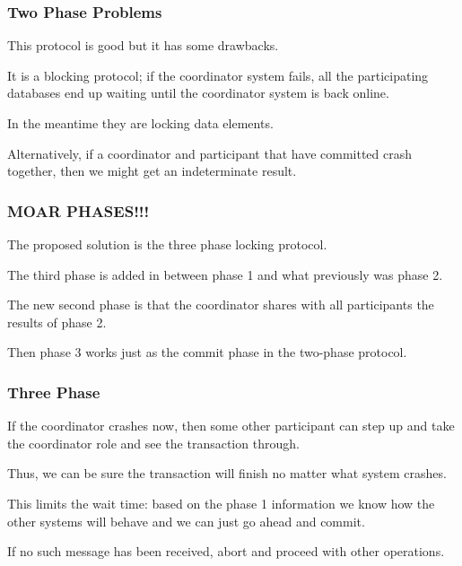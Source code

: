 \begin{frame}
\frametitle{Two Phase Problems}

This protocol is good but it has some drawbacks. 

It is a blocking protocol; if the coordinator system fails, all the participating databases end up waiting until the coordinator system is back online. 

In the meantime they are locking data elements.

Alternatively, if a coordinator and participant that have committed crash together, then we might get an indeterminate result.

\end{frame}

\begin{frame}
\frametitle{MOAR PHASES!!!}

The proposed solution is the \alert{three phase locking protocol}. 

The third phase is added in between phase 1 and what previously was phase 2. 

The new second phase is that the coordinator shares with all participants the results of phase 2. 

Then phase 3 works just as the commit phase in the two-phase protocol.

\end{frame}

\begin{frame}
\frametitle{Three Phase}
If the coordinator crashes now, then some other participant can step up and take the coordinator role and see the transaction through. 

Thus, we can be sure the transaction will finish no matter what system crashes. 

This limits the wait time: based on the phase 1 information we know how the other systems will behave and we can just go ahead and commit. 

If no such message has been received, abort and proceed with other operations.

\end{frame}




